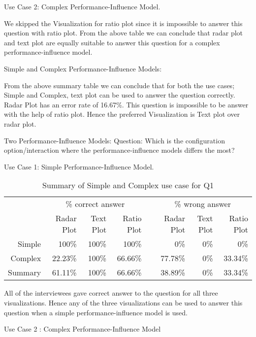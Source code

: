 Use Case 2: Complex Performance-Influence Model.



We skipped the Visualization for ratio plot since it is impossible to answer this question with ratio plot.
From the above table we can conclude that radar plot and text plot are equally suitable to answer this question for a complex performance-influence model.

Simple and Complex Performance-Influence Models:

From the above summary table we can conclude that for both the use cases; Simple and Complex, text plot can be used to answer the question correctly. Radar Plot has an error rate of 16.67\%. This question is impossible to be answer with the help of ratio plot. Hence the preferred Visualization is Text plot over radar plot.

Two Performance-Influence Models:
\newline
Question: Which is the configuration option/interaction where the performance-influence models differs the most?

Use Case 1: Simple Performance-Influence Model.

\begin{table*}[htbp]
\begin{tabular}{@{}rrrrcrrr@{}}\toprule
    & \multicolumn{3}{c}{\% correct answer} & \phantom{abc}& \multicolumn{3}{c}{\% wrong answer} \\
\cmidrule{2-4} \cmidrule{6-8} \cmidrule{10-12}
& Radar Plot & Text Plot & Ratio Plot && Radar Plot & Text Plot & Ratio Plot \\ \midrule
Simple & 100\% & 100\% & 100\% && 0\% & 0\% & 0\% \\
Complex & 22.23\% & 100\% & 66.66\% && 77.78\% & 0\% & 33.34\%\\
\toprule
Summary & 61.11\% & 100\% & 66.66\% && 38.89\% & 0\% & 33.34\%\\
\bottomrule
\end{tabular}
\caption{Summary of Simple and Complex use case for Q1}
\end{table*}



All of the interviewees gave correct answer to the question for all three visualizations. Hence any of the three visualizations can be used to answer this question when a simple performance-influence model is used.

Use Case 2 : Complex Performance-Influence Model



